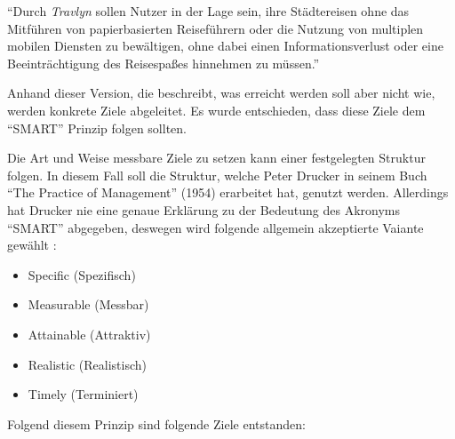 \enquote{Durch \textit{Travlyn} sollen Nutzer in der Lage sein, ihre Städtereisen ohne das Mitführen von papierbasierten Reiseführern oder die Nutzung von multiplen mobilen Diensten zu bewältigen, ohne dabei einen Informationsverlust oder eine Beeinträchtigung des Reisespaßes hinnehmen zu müssen.}

\vspace{0.25cm}

Anhand dieser Version, die beschreibt, was erreicht werden soll aber nicht wie, werden konkrete Ziele abgeleitet. Es wurde entschieden, dass diese Ziele dem \enquote{SMART} Prinzip folgen sollten.

\begin{defStrich}
	Die Art und Weise messbare Ziele zu setzen kann einer festgelegten Struktur folgen. In diesem Fall soll die Struktur, welche Peter Drucker in seinem Buch \enquote{The Practice of Management} (1954) erarbeitet hat, genutzt werden. Allerdings hat Drucker nie eine genaue Erklärung zu der Bedeutung des Akronyms \enquote{SMART} abgegeben, deswegen wird folgende allgemein akzeptierte Vaiante gewählt \cite{Lawlor.2012}:
	\begin{itemize}
		\item Specific (Spezifisch)
		\item Measurable (Messbar)
		\item Attainable (Attraktiv)
		\item Realistic (Realistisch)
		\item Timely (Terminiert)
	\end{itemize}   
\end{defStrich} 

Folgend diesem Prinzip sind folgende Ziele entstanden:

